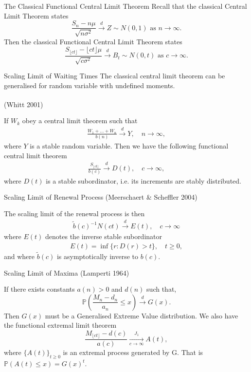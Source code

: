 \documentclass{beamer}
\newcommand{\PP}{\mathbb{P}}
\newcommand{\cd}{\overset{d}{\longrightarrow}}
\newcommand{\Floor}[1]{{\lfloor {#1} \rfloor}}
\begin{document}
\begin{frame}{The Classical Functional Central Limit Theorem}
Recall that the classical Central Limit Theorem states
\[
\frac{S_n-n\mu}{\sqrt{n\sigma^2}}\overset{d}{\longrightarrow}Z\sim N(0,1)\textrm{ as $n\to\infty$}.
\]
Then the classical Functional Central Limit Theorem states
\[
\frac{S_{\lfloor ct\rfloor}-\lfloor ct \rfloor \mu}{\sqrt{c\sigma^2}}\overset{d}{\longrightarrow}B_t\sim N(0,t)\textrm{ as $c\to\infty$}.
\]
\end{frame}


\begin{frame}{Scaling Limit of Waiting Times}
The classical central limit theorem can be generalised for random variable with undefined moments.
\\~\\
(Whitt 2001)

If $W_k$ obey a central limit theorem such that
\begin{align*}
	\frac{W_1 + \ldots + W_n}{b(n)} \overset{d}{\longrightarrow} Y, \quad n \to \infty,
\end{align*}
where $Y$ is a stable random variable. Then we have the following functional central limit theorem
\begin{align*}
\frac{S_\Floor{ct}}{b(c)} \cd D(t), \quad c \to \infty,
\end{align*}
where $D(t)$ is a stable subordinator, i.e. its increments are stably distributed.

\end{frame}

\begin{frame}{Scaling Limit of Renewal Process}
(Meerschaert \& Scheffler 2004) 

The scaling limit of the renewal process is then
\begin{align*}
\tilde b(c)^{-1}N(ct) \cd E(t), \quad c \to \infty
\end{align*}
where $E(t)$ denotes the inverse stable subordinator
\begin{align*}
E(t) = \inf\{r: D(r) > t\}, \quad t \ge 0,
\end{align*}
and where $\tilde b(c)$ is asymptotically inverse to $b(c)$.
\end{frame}

\begin{frame}{Scaling Limit of Maxima}
(Lamperti 1964)

If there exists constants $a(n)>0$ and $d(n)$ such that,
\[
	\PP\left(\frac{M_n -d_n}{a_n} \leq x \right) \cd G(x) .
\]
Then $G(x)$ must be a Generalised Extreme Value distribution. We also have the functional extremal limit theorem 
\[
\frac{M_\Floor{ct}-d(c)}{a(c)} \xrightarrow[c\to \infty]{J_1} A(t),
\]
where $\{A(t)\}_{t\geq0}$ is an extremal process generated by G. That is $\PP(A(t)\leq x)=G(x)^t$.
\end{frame}
\end{document}

